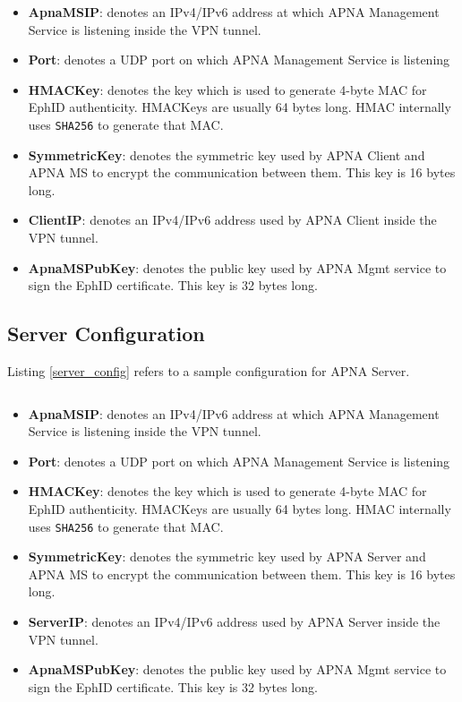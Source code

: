 \begin{itemize}
    \item \textbf{ApnaMSIP}: denotes an IPv4/IPv6 address at which APNA Management Service is listening inside the VPN tunnel.
    \item \textbf{Port}: denotes a UDP port on which APNA Management Service is listening
    \item \textbf{HMACKey}: denotes the key which is used to generate 4-byte MAC for EphID authenticity. HMACKeys are usually 64 bytes long. HMAC internally uses \texttt{SHA256} to generate that MAC.
    \item \textbf{SymmetricKey}: denotes the symmetric key used by APNA Client and APNA MS to encrypt the communication between them. This key is 16 bytes long.
    \item \textbf{ClientIP}: denotes an IPv4/IPv6 address used by APNA Client inside the VPN tunnel.
    \item \textbf{ApnaMSPubKey}: denotes the public key used by APNA Mgmt service to sign the EphID certificate. This key is 32 bytes long.
\end{itemize}

\subsection{Server Configuration}
Listing \ref{server_config} refers to a sample configuration for APNA Server.
\begin{code}
\inputminted[frame=lines, framesep=2mm, baselinestretch=1.2, fontsize=\footnotesize, breaklines]{json}{code_snippets/server.json} \label{server_config}
\end{code}

\begin{itemize}
    \item \textbf{ApnaMSIP}: denotes an IPv4/IPv6 address at which APNA Management Service is listening inside the VPN tunnel.
    \item \textbf{Port}: denotes a UDP port on which APNA Management Service is listening
    \item \textbf{HMACKey}: denotes the key which is used to generate 4-byte MAC for EphID authenticity. HMACKeys are usually 64 bytes long. HMAC internally uses \texttt{SHA256} to generate that MAC.
    \item \textbf{SymmetricKey}: denotes the symmetric key used by APNA Server and APNA MS to encrypt the communication between them. This key is 16 bytes long.
    \item \textbf{ServerIP}: denotes an IPv4/IPv6 address used by APNA Server inside the VPN tunnel.
    \item \textbf{ApnaMSPubKey}: denotes the public key used by APNA Mgmt service to sign the EphID certificate. This key is 32 bytes long.
\end{itemize}